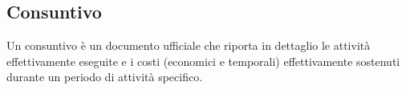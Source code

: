 \subsection{Consuntivo}
    Un consuntivo è un documento ufficiale che riporta in dettaglio le attività effettivamente eseguite e i costi (economici e temporali) effettivamente sostenuti durante un periodo di attività specifico.
